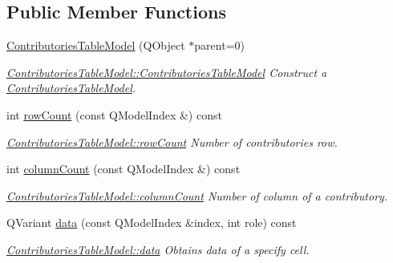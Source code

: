 \subsection*{Public Member Functions}
\begin{DoxyCompactItemize}
\item 
\hyperlink{classGui_1_1Widgets_1_1WdgModels_1_1ContributoriesTableModel_abfc7cdc96006729fa8b03571bb8b586b}{Contributories\+Table\+Model} (Q\+Object $\ast$parent=0)
\begin{DoxyCompactList}\small\item\em \hyperlink{classGui_1_1Widgets_1_1WdgModels_1_1ContributoriesTableModel_abfc7cdc96006729fa8b03571bb8b586b}{Contributories\+Table\+Model\+::\+Contributories\+Table\+Model} Construct a \hyperlink{classGui_1_1Widgets_1_1WdgModels_1_1ContributoriesTableModel}{Contributories\+Table\+Model}. \end{DoxyCompactList}\item 
int \hyperlink{classGui_1_1Widgets_1_1WdgModels_1_1ContributoriesTableModel_a4adfd94506448337ceac8504b76531aa}{row\+Count} (const Q\+Model\+Index \&) const 
\begin{DoxyCompactList}\small\item\em \hyperlink{classGui_1_1Widgets_1_1WdgModels_1_1ContributoriesTableModel_a4adfd94506448337ceac8504b76531aa}{Contributories\+Table\+Model\+::row\+Count} Number of contributories row. \end{DoxyCompactList}\item 
int \hyperlink{classGui_1_1Widgets_1_1WdgModels_1_1ContributoriesTableModel_ab052217cb08f856ecfe465458f95c174}{column\+Count} (const Q\+Model\+Index \&) const 
\begin{DoxyCompactList}\small\item\em \hyperlink{classGui_1_1Widgets_1_1WdgModels_1_1ContributoriesTableModel_ab052217cb08f856ecfe465458f95c174}{Contributories\+Table\+Model\+::column\+Count} Number of column of a contributory. \end{DoxyCompactList}\item 
Q\+Variant \hyperlink{classGui_1_1Widgets_1_1WdgModels_1_1ContributoriesTableModel_aa95bb13ea63275f96187150a8a2d3972}{data} (const Q\+Model\+Index \&index, int role) const 
\begin{DoxyCompactList}\small\item\em \hyperlink{classGui_1_1Widgets_1_1WdgModels_1_1ContributoriesTableModel_aa95bb13ea63275f96187150a8a2d3972}{Contributories\+Table\+Model\+::data} Obtains data of a specify cell. \end{DoxyCompactList}\item 

\end{DoxyCompactItemize}

